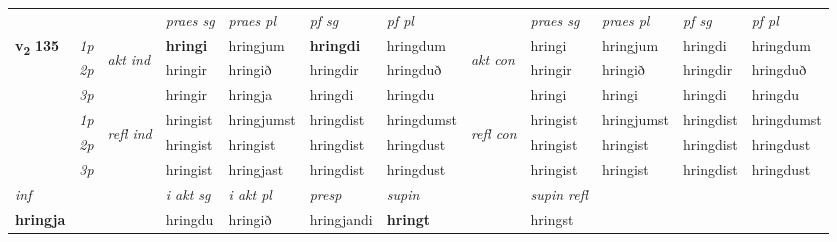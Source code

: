 \begin{longtable}[l]{X>{\footnotesize\itshape}llXXXXlXXXX}
 & &   & \textit{praes sg}  & \textit{praes pl}    & \textit{ pf sg} & \textit{pf pl} & & \textit{praes sg}  & \textit{praes pl}    & \textit{pf sg} & \textit{pf pl }  \\ \cmidrule{4-7} \cmidrule{9-12}
 \multirow{2}{*}{{{\textbf{v{\textsubscript{2}}} \Large{\textbf{135}}}}}  & 1p & \multirow{3}{*}{\begin{turn}{90}\textit{akt ind}\end{turn}} & \textbf{hringi} & hringjum & \textbf{hringdi} & hringdum & \multirow{3}{*}{\begin{turn}{90}\textit{akt con}\end{turn}} &hringi & hringjum & hringdi & hringdum\\*
 & 2p &  &  hringir  & hringið & hringdir & hringduð & & hringir & hringið & hringdir & hringduð \\*
 & 3p &  & hringir & hringja & hringdi & hringdu & & hringi & hringi& hringdi & hringdu \\*
\cmidrule{4-7} \cmidrule{9-12}
 & 1p & \multirow{3}{*}{\begin{turn}{90}\textit{refl ind}\end{turn}}  & hringist & hringjumst & hringdist & hringdumst & \multirow{3}{*}{\begin{turn}{90}\textit{refl con}\end{turn}}  &hringist & hringjumst & hringdist & hringdumst \\*
 & 2p &  & hringist & hringist & hringdist & hringdust & &hringist & hringist & hringdist & hringdust \\*
 & 3p  & & hringist & hringjast & hringdist & hringdust & & hringist & hringist& hringdist & hringdust \\*
\cmidrule{4-7} \cmidrule{9-12}

   {\textit{inf}} & &  & \textit{i akt sg} & \textit{i akt pl}   & \textit{presp} & \textit{supin} && \textit{supin refl}  \\*
  {\textbf{hringja}} & && hringdu  & hringið   & hringjandi &  \textbf{hringt} && hringst  \\*

\midrule


\end{longtable}
